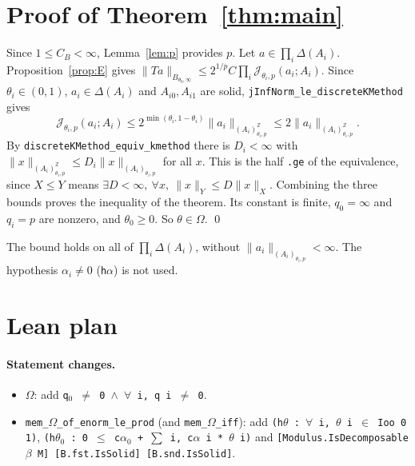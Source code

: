 \documentclass[11pt]{article}
\theoremstyle{definition}
\theoremstyle{remark}
\newcommand{\norm}[2]{\lVert #1\rVert_{#2}}
\newcommand{\cJ}{\mathcal J}
\newcommand{\Z}{\mathbb Z}
\begin{document}
\section{Proof of Theorem~\ref{thm:main}}

Since \(1\le C_B<\infty\), Lemma~\ref{lem:p} provides \(p\). Let
\(a\in\prod_i\Delta(A_i)\). Proposition~\ref{prop:E} gives
\(\norm{Ta}{B_{\theta_0,\infty}}\le2^{1/p}C\prod_i\cJ_{\theta_i,p}(a_i;A_i)\). Since
\(\theta_i\in(0,1)\), \(a_i\in\Delta(A_i)\) and \(A_{i0}, A_{i1}\) are solid,
\texttt{jInfNorm\_le\_discreteKMethod} gives
\[
  \cJ_{\theta_i,p}(a_i;A_i)\le2^{\min(\theta_i,1-\theta_i)}\norm{a_i}{(A_i)^{\Z}_{\theta_i,p}}
  \le2\norm{a_i}{(A_i)^{\Z}_{\theta_i,p}}.
\]
By \texttt{discreteKMethod\_equiv\_kmethod} there is \(D_i<\infty\) with
\(\norm{x}{(A_i)^{\Z}_{\theta_i,p}}\le D_i\norm{x}{(A_i)_{\theta_i,p}}\) for all \(x\). This is the
half \texttt{.ge} of the equivalence, since \(X\le Y\) means
\(\exists D<\infty,\ \forall x,\ \norm{x}{Y}\le D\norm{x}{X}\). Combining the three bounds
proves the inequality of the theorem. Its constant is finite, \(q_0 = \infty\) and
\(q_i = p\) are nonzero, and \(\theta_0\ge0\). So \(\theta\in\Omega\). \qed

\medskip
The bound holds on all of \(\prod_i\Delta(A_i)\), without
\(\norm{a_i}{(A_i)_{\theta_i,p}}<\infty\). The hypothesis \(\alpha_i\ne0\)
(\texttt{h\(\alpha\)}) is not used.

\section{Lean plan}
\raggedright

\paragraph{Statement changes.}
\begin{itemize}
  \item \texttt{\(\Omega\)}: add \texttt{q\(_0\) \(\ne\) 0 \(\wedge\) \(\forall\) i, q i \(\ne\) 0}.
  \item \texttt{mem\_\(\Omega\)\_of\_enorm\_le\_prod} (and \texttt{mem\_\(\Omega\)\_iff}): add
    \texttt{(h\(\theta\) : \(\forall\) i, \(\theta\) i \(\in\) Ioo 0 1)},
    \texttt{(h\(\theta_0\) : 0 \(\le\) c\(\alpha_0\) + \(\sum\) i, c\(\alpha\) i * \(\theta\) i)} and
    \texttt{[Modulus.IsDecomposable \(\beta\) M] [B.fst.IsSolid] [B.snd.IsSolid]}.
\end{itemize}
\end{document}
